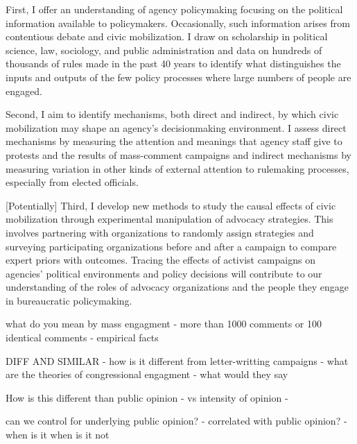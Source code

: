 First, I offer an understanding of agency policymaking focusing on the political information available to policymakers. Occasionally, such information arises from contentious debate and civic mobilization. I draw on scholarship in political science, law, sociology, and public administration and data on hundreds of thousands of rules made in the past 40 years to identify what distinguishes the inputs and outputs of the few policy processes where large numbers of people are engaged.

Second, I aim to identify mechanisms, both direct and indirect, by which civic mobilization may shape an agency's decisionmaking environment. I assess direct mechanisms by measuring the attention and meanings that agency staff give to protests and the results of mass-comment campaigns and indirect mechanisms by measuring variation in other kinds of external attention to rulemaking processes, especially from elected officials.

[Potentially] Third, I develop new methods to study the causal effects of civic mobilization through experimental manipulation of advocacy strategies. This involves partnering with organizations to randomly assign strategies and surveying participating organizations before and after a campaign to compare expert priors with outcomes. 
Tracing the effects of activist campaigns on agencies' political environments and policy decisions will contribute to our understanding of the roles of advocacy organizations and the people they engage in bureaucratic policymaking. 



what do you mean by mass engagment 
- more than 1000 comments or 100 identical comments 
- empirical facts 

DIFF AND SIMILAR 
- how is it different from letter-writting campaigns 
- what are the theories of congressional engagment - what would they say

How is this different than public opinion 
- vs intensity of opinion 
- 

can we control for underlying public opinion? 
- correlated with public opinion? 
- when is it when is it not 

